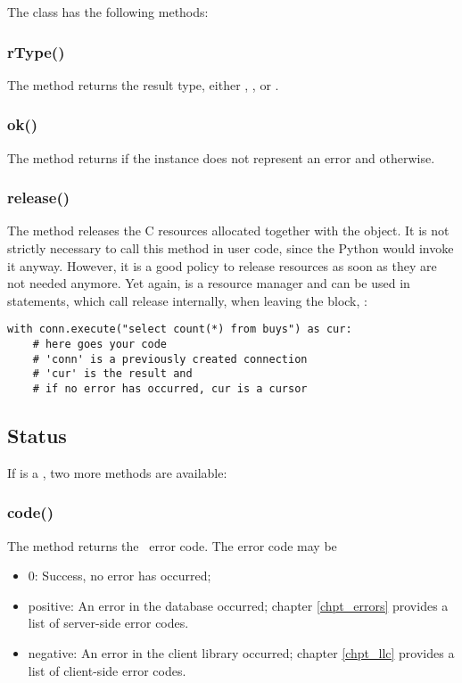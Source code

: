 The  class has the following methods:

\subsubsection{rType()}
The method returns the result type,
either , ,
 or .

\subsubsection{ok()}
The method returns 
if the instance does not represent
an error and  otherwise.

\subsubsection{release()}
The method releases the C resources
allocated together with the  object.
It is not strictly necessary to call
this method in user code, since the
Python  would invoke it anyway.
However, it is a good policy
to release resources as soon as
they are not needed anymore.
Yet again,  is a resource manager
and can be used in  statements,
which call release internally, when leaving
the block, \eg:

\begin{python}
\begin{lstlisting}
with conn.execute("select count(*) from buys") as cur:
    # here goes your code
    # 'conn' is a previously created connection
    # 'cur' is the result and
    # if no error has occurred, cur is a cursor
\end{lstlisting}
\end{python}

\subsection{Status}
If  is a ,
two more methods are available:

\subsubsection{code()}
The method returns the \nowdb\ error code.
The error code may be
\begin{itemize}
\item 0: Success, no error has occurred;
\item positive:
An error in the database occurred;
chapter \ref{chpt_errors} provides a list
of server-side error codes.
\item negative:
An error in the client library occurred;
chapter \ref{chpt_llc} provides a list
of client-side error codes.
\end{itemize}


